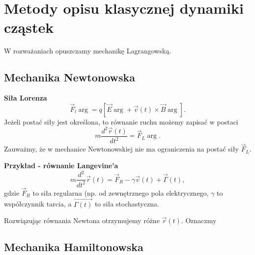 \section{Metody opisu klasycznej dynamiki cząstek}
W rozważaniach opuszczamy mechanikę Lagrangowską. 
\subsection{Mechanika Newtonowska}
\textbf{Siła Lorenza}
\begin{equation}\label{sila_lorenza}
	\vec{F}_l \arg = q [ \vec{E} \arg+\vec{v}(t)\times\vec{B}\arg].
\end{equation}
Jeżeli postać siły jest określona, to równanie ruchu możemy 
zapisać w postaci
\begin{equation}
	m\frac{d^2\vec{r}(t)}{dt^2}=\vec{F}_L \arg  .
\end{equation}
Zauważmy, że w mechanice Newtonowskiej nie ma ograniczenia na 
postać siły $\vec{F}_L$.

\textbf{Przykład - równanie Langevine'a}
$$ m\frac{d^2}{dt^2} \vec{r}(t) = \vec{F}_R - \gamma\vec{v}(t) +
\vec{\Gamma}(t),$$
gdzie $\vec{F}_R$ to siła regularna (np. od zewnętrznego pola 
elektrycznego, $\gamma$ to współczynnik tarcia, a $\vec{\Gamma(t)}$ 
to siła stochastyczna.

Rozwiązując równania Newtona otrzymujemy różne $\vec{r}(t)$. 
Oznaczmy 
\subsection{Mechanika Hamiltonowska}


